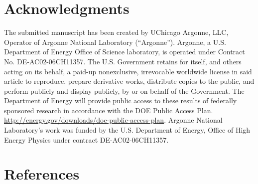 \documentclass[showpacs,showkeys,preprint,prd,nofootinbib,linenumbers,12pt]{revtex4-1}
\begin{document}
\section*{Acknowledgments}
The submitted manuscript has been created by UChicago Argonne, LLC, Operator of Argonne National Laboratory (“Argonne”). Argonne, a U.S.  Department of Energy Office of Science laboratory, is operated under Contract No. DE-AC02-06CH11357. The U.S. Government retains for itself, 
and others acting on its behalf, a paid-up nonexclusive, irrevocable worldwide license in said article to reproduce, prepare derivative works, distribute copies to the public, and perform publicly and display publicly, by or on behalf of the Government.  The Department of Energy will provide public access to these results of federally sponsored research in accordance with the 
DOE Public Access Plan. \url{http://energy.gov/downloads/doe-public-access-plan}. Argonne National Laboratory’s work was funded by the U.S. Department of Energy, Office of High Energy Physics under contract DE-AC02-06CH11357. 



\section*{References}

\end{document}
